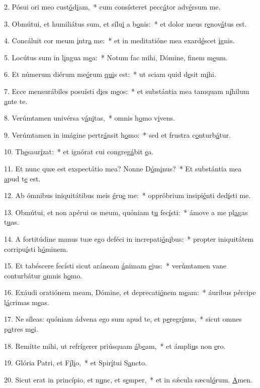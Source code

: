 2. Pósui ori meo cust\uline{ó}d\uline{i}am,~* cum consísteret pecc\uline{á}tor adv\uline{é}rsum me.\par 
3. Obmútui, et humiliátus sum, et sílu\uline{i} a b\uline{o}nis:~* et dolor meus r\uline{e}nov\uline{á}tus est.\par 
4. Concáluit cor meum \uline{i}ntr\uline{a} me:~* et in meditatióne mea exard\uline{é}scet \uline{i}gnis.\par 
5. Locútus sum in l\uline{i}ngua m\uline{e}a:~* Notum fac mihi, Dómine, f\uline{i}nem m\uline{e}um.\par 
6. Et númerum diérum me\uline{ó}rum \uline{qui}s est:~* ut sciam quid d\uline{e}sit m\uline{i}hi.\par 
7. Ecce mensurábiles posuísti d\uline{i}es m\uline{e}os:~* et substántia mea tamquam n\uline{í}hilum \uline{a}nte te.\par 
8. Verúmtamen univérsa v\uline{á}n\uline{i}tas,~* omnis h\uline{o}mo v\uline{i}vens.\par 
9. Verúmtamen in imágine pertr\uline{á}nsit h\uline{o}mo:~* sed et frustra c\uline{o}nturb\uline{á}tur.\par 
10. Th\uline{e}saur\uline{í}zat:~* et ignórat cui congreg\uline{á}bit \uline{e}a.\par 
11. Et nunc quæ est exspectátio mea? Nonne D\uline{ó}m\uline{i}nus?~* Et substántia mea \uline{a}pud t\uline{e} est.\par 
12. Ab ómnibus iniquitátibus meis \uline{é}ru\uline{e} me:~* oppróbrium insipi\uline{é}nti ded\uline{í}sti me.\par 
13. Obmútui, et non apérui os meum, quóniam t\uline{u} fec\uline{í}sti:~* ámove a me pl\uline{a}gas t\uline{u}as.\par 
14. A fortitúdine manus tuæ ego deféci in increpati\uline{ó}n\uline{i}bus:~* propter iniquitátem corripu\uline{í}sti h\uline{ó}minem.\par 
15. Et tabéscere fecísti sicut aráneam \uline{á}nimam \uline{e}jus:~* verúmtamen vane conturbátur \uline{o}mnis h\uline{o}mo.\par 
16. Exáudi oratiónem meam, Dómine, et deprecati\uline{ó}nem m\uline{e}am:~* áuribus pércipe l\uline{á}crimas m\uline{e}as.\par 
17. Ne síleas: quóniam ádvena ego sum apud te, et p\uline{e}regr\uline{í}nus,~* sicut omnes p\uline{a}tres m\uline{e}i.\par 
18. Remítte mihi, ut refrígerer priúsquam \uline{á}b\uline{e}am,~* et ámpli\uline{u}s non \uline{e}ro.\par 
19. Glória Patri, et F\uline{í}l\uline{i}o,~* et Spir\uline{í}tui S\uline{a}ncto.\par 
20. Sicut erat in princípio, et n\uline{u}nc, et s\uline{e}mper,~* et in sǽcula sæcul\uline{ó}rum. \uline{A}men.\par 
